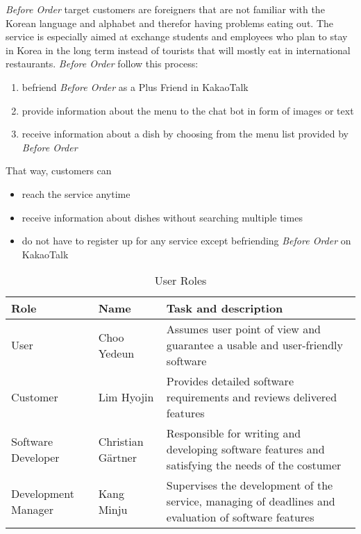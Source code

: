  \emph{Before Order} target customers are foreigners that are not familiar with the Korean language and alphabet and therefor having problems eating out. The service is especially aimed at exchange students and employees who plan to stay in Korea in the long term instead of tourists that will mostly eat in international restaurants. \emph{Before Order} follow this process: 
 
\begin{enumerate}[label=Step \arabic*:, leftmargin=1.5cm]
\item befriend \emph{Before Order} as a Plus Friend in KakaoTalk
\item provide information about the menu to the chat bot in form of images or text
\item receive information about a dish by choosing from the menu list provided by \emph{Before Order}
\end{enumerate}

That way, customers can 
\begin{itemize}
\item reach the service anytime
\item receive information about dishes without searching multiple times
\item do not have to register up for any service except befriending \emph{Before Order} on KakaoTalk
\end{itemize}

\begin{table}[htb]
\caption{User Roles}
\begin{tabularx}{\linewidth}{|X|X|X|}
\toprule
Role                & Name              & Task and description \\
\midrule
User                & Choo Yedeun       & Assumes user point of view and guarantee a usable and user-friendly software \\
Customer            & Lim Hyojin        & Provides detailed software requirements and reviews delivered features \\
Software Developer  & Christian Gärtner & Responsible for writing and developing software features and satisfying the needs of the costumer    \\
Development Manager & Kang Minju        & Supervises the development of the service, managing of deadlines and evaluation of software features
\end{tabularx}
\end{table}
\FloatBarrier